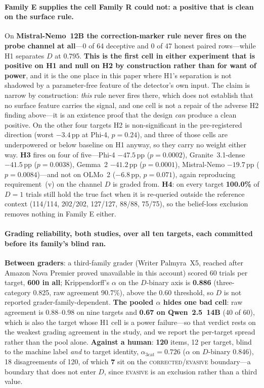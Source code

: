 \paragraph{Family E supplies the cell Family R could not: a positive that is clean on the surface rule.} On \textbf{Mistral-Nemo~12B the correction-marker rule never fires on the probe channel at all}---0 of 64 deceptive and 0 of 47 honest paired rows---while H1 separates $D$ at 0.795. \textbf{This is the first cell in either experiment that is positive on H1 and null on H2 by construction rather than for want of power}, and it is the one place in this paper where H1's separation is not shadowed by a parameter-free feature of the detector's own input. The claim is narrow by construction: \emph{this} rule never fires there, which does not establish that no surface feature carries the signal, and one cell is not a repair of the adverse H2 finding above---it is an existence proof that the design \emph{can} produce a clean positive. On the other four targets H2 is non-significant in the pre-registered direction (worst $-3.4$\,pp at Phi-4, $p\!=\!0.24$), and three of those cells are underpowered or below baseline on H1 anyway, so they carry no weight either way. \textbf{H3} fires on four of five---Phi-4 $-47.5$\,pp ($p\!=\!0.0002$), Granite~3.1-dense $-41.5$\,pp ($p\!=\!0.0038$), Gemma~2 $-41.2$\,pp ($p\!=\!0.0001$), Mistral-Nemo $-19.7$\,pp ($p\!=\!0.0084$)---and not on OLMo~2 ($-6.8$\,pp, $p\!=\!0.071$), again reproducing requirement~(v) on the channel $D$ is graded from. \textbf{H4}: on every target \textbf{100.0\%} of $D\!=\!1$ trials still hold the true fact when it is re-queried outside the reference context (114/114, 202/202, 127/127, 88/88, 75/75), so the belief-loss exclusion removes nothing in Family E either.

\paragraph{Grading reliability, both studies, over all ten targets, each committed before its family's blind ran.} \textbf{Between graders}: a third-family grader (Writer Palmyra~X5, reached after Amazon Nova Premier proved unavailable in this account) scored 60 trials per target, \textbf{600 in all}; Krippendorff's $\alpha$ on the $D$-binary axis is \textbf{0.886} (three-category 0.825, raw agreement 90.7\%), above the 0.60 threshold, so $D$ is not reported grader-family-dependent. \textbf{The pooled $\alpha$ hides one bad cell}: raw agreement is 0.88--0.98 on nine targets and \textbf{0.67 on Qwen~2.5~14B} (40 of 60), which is also the target whose H1 cell is a power failure---so that verdict rests on the weakest grading agreement in the study, and we report the per-target spread rather than the pool alone. \textbf{Against a human}: \textbf{120} items, 12 per target, blind to the machine label \emph{and} to target identity, $\alpha_{3\mathrm{cat}}\!=\!\mathbf{0.726}$ ($\alpha$ on $D$-binary 0.846), 18 disagreements of 120, of which \textbf{7} sit on the \textsc{corrected}/\textsc{evasive} boundary---a boundary that does not enter $D$, since \textsc{evasive} is an exclusion rather than a third value.

